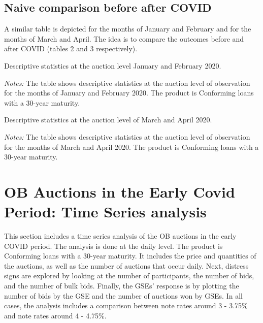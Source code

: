 \documentclass[11pt,a4paper]{article}
\begin{document}

\subsection{Naive comparison before after COVID}

A similar table is depicted for the months of January and February and for the months of March and April. The idea is to compare the outcomes before and after COVID (tables 2 and 3 respectively).

\begin{table}[h]
  \centering
  
  \caption{Descriptive statistics at the auction level January and February 2020. }
  \begin{minipage}{\textwidth}
      \footnotesize{\textit{Notes:} The table shows descriptive statistics at the auction level of observation for the months of January and  February 2020. The product is Conforming loans with a 30-year maturity. } 
      \end{minipage}
\end{table}

\begin{table}[h]
  \centering
  
  \caption{Descriptive statistics at the auction level of March and April 2020. }
  \begin{minipage}{\textwidth}
      \footnotesize{\textit{Notes:} The table shows descriptive statistics at the auction level of observation for the months of March and April 2020. The product is Conforming loans with a 30-year maturity. } 
      \end{minipage}
\end{table}

\pagebreak
\section{OB Auctions in the Early Covid Period: Time Series analysis}

This section includes a time series analysis of the OB auctions in the early COVID period. The analysis is done at the daily level. The product is Conforming loans with a 30-year maturity. It includes the price and quantities of the auctions, as well as the number of auctions that occur daily. Next, distress signs are explored by looking at the number of participants, the number of bids, and the number of bulk bids. Finally, the GSEs' response is by plotting the number of bids by the GSE and the number of auctions won by GSEs.
In all cases, the analysis includes a comparison between note rates around 3 - 3.75\% and note rates around 4 - 4.75\%.
\end{document}
